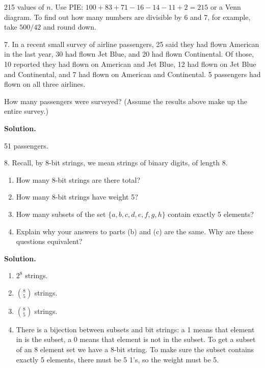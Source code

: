 \documentclass[10pt,]{book}
\theoremstyle{plain}
\theoremstyle{definition}
\theoremstyle{definition}
\theoremstyle{definition}
\numberwithin{equation}{section}
\begin{document}
\begin{exerciselist}
            215 values of \(n\). Use PIE: \(100 + 83 + 71 - 16 - 14 -11 + 2 = 215\) or a Venn diagram. To find out how many numbers are divisible by 6 and 7, for example, take \(500/42\) and round down.
\item[7.]\hypertarget{exercise-108}{}
            In a recent small survey of airline passengers, 25 said they had flown American in the last year, 30 had flown Jet Blue, and 20 had flown Continental. Of those, 10 reported they had flown on American and Jet Blue, 12 had flown on Jet Blue and Continental, and 7 had flown on American and Continental. 5 passengers had flown on all three airlines.
\par

            How many passengers were surveyed? (Assume the results above make up the entire survey.)
\par\smallskip
\par\smallskip
\noindent\textbf{Solution.}\hypertarget{solution-159}{}\quad

            51 passengers.
\item[8.]\hypertarget{exercise-109}{}
            Recall, by \(8\)-bit strings, we mean strings of binary digits, of length 8.
            \leavevmode%
\begin{enumerate}[label=(\alph*)]
\item\hypertarget{li-733}{}
                How many \(8\)-bit strings are there total?
\item\hypertarget{li-734}{}
                How many \(8\)-bit strings have weight 5?
\item\hypertarget{li-735}{}
                How many subsets of the set \(\{a,b,c,d,e,f,g,h\}\) contain exactly 5 elements?
\item\hypertarget{li-736}{}
                Explain why your answers to parts (b) and (c) are the same. Why are these questions equivalent?
\end{enumerate}

\par\smallskip
\par\smallskip
\noindent\textbf{Solution.}\hypertarget{solution-160}{}\quad

          \leavevmode%
\begin{enumerate}[label=(\alph*)]
\item\hypertarget{li-737}{}\(2^8\) strings.%
\item\hypertarget{li-738}{}\({8 \choose 5}\) strings.%
\item\hypertarget{li-739}{}\({8 \choose 5}\) strings.%
\item\hypertarget{li-740}{}
                There is a bijection between subsets and bit strings: a 1 means that element in is the subset, a 0 means that element is not in the subset. To get a subset of an 8 element set we have a 8-bit string. To make sure the subset contains exactly 5 elements, there must be 5 1's, so the weight must be 5.
\end{enumerate}


\end{exerciselist}
\end{document}
